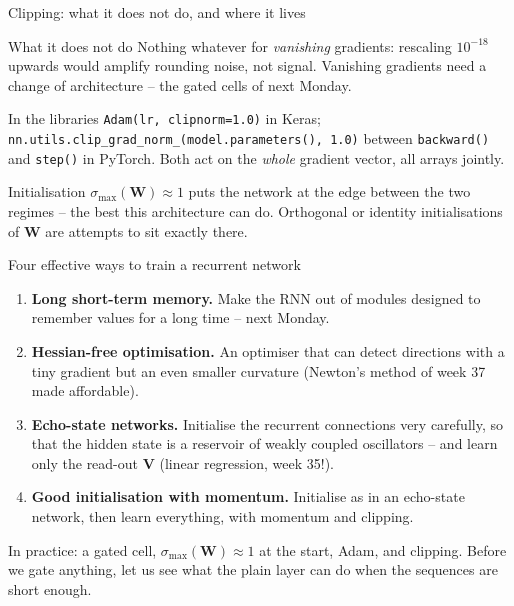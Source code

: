 \documentclass[10pt,aspectratio=169]{beamer}
\begin{document}
\begin{frame}{Clipping: what it does not do, and where it lives}
\begin{block}{What it does not do}
Nothing whatever for \emph{vanishing} gradients: rescaling $10^{-18}$
upwards would amplify rounding noise, not signal.  Vanishing gradients need
a change of architecture -- the gated cells of next Monday.
\end{block}
\begin{block}{In the libraries}
\texttt{Adam(lr, clipnorm=1.0)} in Keras;
\texttt{nn.utils.clip\_grad\_norm\_(model.parameters(), 1.0)} between
\texttt{backward()} and \texttt{step()} in PyTorch.  Both act on the
\emph{whole} gradient vector, all arrays jointly.
\end{block}
\begin{block}{Initialisation}
$\sigma_{\max}(\bm{W})\approx1$ puts the network at the edge between the
two regimes -- the best this architecture can do.  Orthogonal or identity
initialisations of $\bm{W}$ are attempts to sit exactly there.
\end{block}
\end{frame}

\begin{frame}{Four effective ways to train a recurrent network}
\begin{enumerate}
  \item \textbf{Long short-term memory.}  Make the RNN out of modules
        designed to remember values for a long time -- next Monday.
  \item \textbf{Hessian-free optimisation.}  An optimiser that can detect
        directions with a tiny gradient but an even smaller curvature
        (Newton's method of week 37 made affordable).
  \item \textbf{Echo-state networks.}  Initialise the recurrent
        connections very carefully, so that the hidden state is a reservoir
        of weakly coupled oscillators -- and learn only the read-out $\bm{V}$
        (linear regression, week 35!).
  \item \textbf{Good initialisation with momentum.}  Initialise as in an
        echo-state network, then learn everything, with momentum and
        clipping.
\end{enumerate}
\medskip
In practice: a gated cell, $\sigma_{\max}(\bm{W})\approx1$ at the start,
Adam, and clipping.  Before we gate anything, let us see what the plain
layer can do when the sequences are short enough.
\end{frame}
\end{document}
